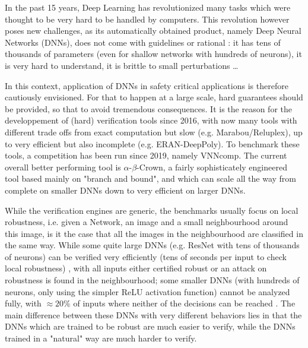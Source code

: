 In the past 15 years, Deep Learning has revolutionized many tasks which were thought to be very hard to be handled by computers. This revolution however poses new challenges, as its automatically obtained product, namely Deep Neural Networks (DNNs), does not come with guidelines or rational : it has tens of thousands of parameters (even for shallow networks with hundreds of neurons), it is very hard to understand, it is brittle to small perturbations \cite{Szegedy}\dots

In this context, application of DNNs in safety critical applications is therefore cautiously envisioned. For that to happen at a large scale, hard guarantees should be provided, so that to avoid tremendous consequences. It is the reason for the developpement of (hard) verification tools since 2016, with now many tools with different trade offs from exact computation but slow (e.g. Marabou/Reluplex), up to very efficient but also incomplete (e.g. ERAN-DeepPoly). To benchmark these tools, a competition has been run since 2019, namely VNNcomp. The current overall better performing tool is $\alpha$-$\beta$-Crown, a fairly sophisticately engineered tool based mainly on "branch and bound", and which can scale all the way from complete on smaller DNNs down to very efficient on larger DNNs.


While the verification engines are generic, the benchmarks usually focus on local robustness, i.e. given a Network, an image and a small neighbourhood around this image, 
is it the case that all the images in the neighbourhood are classified in the same way.
While some quite large DNNs (e.g. ResNet with tens of thousands of neurons) can be verified very efficiently (tens of seconds per input to check local robustness) \cite{crown}, with all inputs either certified robust or an attack on robustness is found in the neighbourhood;
some smaller DNNs (with hundreds of neurons, only using the simpler ReLU activation function) cannot be analyzed fully, with $\approx 20 \%$ of inputs where neither of the decisions can be reached \cite{crown}. The main difference between these DNNs with very different behaviors lies in that the DNNs which are trained to be robust are much easier to verify, while the DNNs trained in a "natural" way are much harder to verify.


